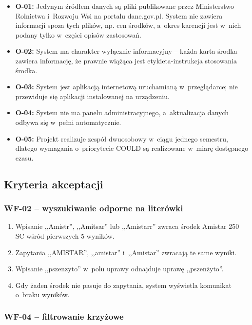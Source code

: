 \begin{itemize}
    \item \textbf{O-01:} Jedynym źródłem danych są pliki publikowane przez
    Ministerstwo Rolnictwa i~Rozwoju Wsi na portalu dane.gov.pl. System nie
    zawiera informacji spoza tych plików, np. cen środków, a~okres karencji
    jest w~nich podany tylko w~części opisów zastosowań.
    \item \textbf{O-02:} System ma charakter wyłącznie informacyjny -- każda
    karta środka zawiera informację, że prawnie wiążąca jest
    etykieta-instrukcja stosowania środka.
    \item \textbf{O-03:} System jest aplikacją internetową uruchamianą
    w~przeglądarce; nie przewiduje się aplikacji instalowanej na urządzeniu.
    \item \textbf{O-04:} System nie ma panelu administracyjnego, a~aktualizacja
    danych odbywa się w~pełni automatycznie.
    \item \textbf{O-05:} Projekt realizuje zespół dwuosobowy w~ciągu jednego
    semestru, dlatego wymagania o~priorytecie COULD są realizowane w~miarę
    dostępnego czasu.
\end{itemize}

\subsection{Kryteria akceptacji}

\subsubsection{WF-02 -- wyszukiwanie odporne na literówki}

\begin{enumerate}
    \item Wpisanie ,,Amistr'', ,,Amitsar'' lub ,,Amistarr'' zwraca środek
    Amistar 250 SC wśród pierwszych 5 wyników.
    \item Zapytania ,,AMISTAR'', ,,amistar'' i~,,Amistar'' zwracają te same
    wyniki.
    \item Wpisanie ,,pszenzyto'' w~polu uprawy odnajduje uprawę ,,pszenżyto''.
    \item Gdy żaden środek nie pasuje do zapytania, system wyświetla komunikat
    o~braku wyników.
\end{enumerate}

\subsubsection{WF-04 -- filtrowanie krzyżowe}

